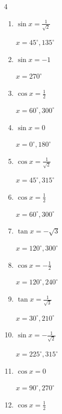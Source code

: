 \begin{multicols}{4}
\begin{enumerate}
        $\displaystyle x = 120^{\circ} , 300^{\circ}$

  \item $\displaystyle \sin{x}  = \frac{1}{\sqrt{2}}$

        $\displaystyle x = 45^{\circ} , 135^{\circ}$

  \item $\displaystyle \sin{x}  = -1$

        $\displaystyle x = 270^{\circ}$

  \item $\displaystyle \cos{x}  = \frac{1}{2}$

        $\displaystyle x = 60^{\circ} , 300^{\circ}$

  \item $\displaystyle \sin{x}  = 0$

        $\displaystyle x = 0^{\circ} , 180^{\circ}$

  \item $\displaystyle \cos{x}  = \frac{1}{\sqrt{2}}$

        $\displaystyle x = 45^{\circ} , 315^{\circ}$

  \item $\displaystyle \cos{x}  = \frac{1}{2}$

        $\displaystyle x = 60^{\circ} , 300^{\circ}$

  \item $\displaystyle \tan{x}  = -\sqrt{3}$

        $\displaystyle x = 120^{\circ} , 300^{\circ}$

  \item $\displaystyle \cos{x}  = -\frac{1}{2}$

        $\displaystyle x = 120^{\circ} , 240^{\circ}$

  \item $\displaystyle \tan{x}  = \frac{1}{\sqrt{3}}$

        $\displaystyle x = 30^{\circ} , 210^{\circ}$

  \item $\displaystyle \sin{x}  = -\frac{1}{\sqrt{2}}$

        $\displaystyle x = 225^{\circ} , 315^{\circ}$

\columnbreak %

  \item $\displaystyle \cos{x}  = 0$

        $\displaystyle x = 90^{\circ} , 270^{\circ}$

  \item $\displaystyle \cos{x}  = \frac{1}{2}$


\end{enumerate}
\end{multicols}
